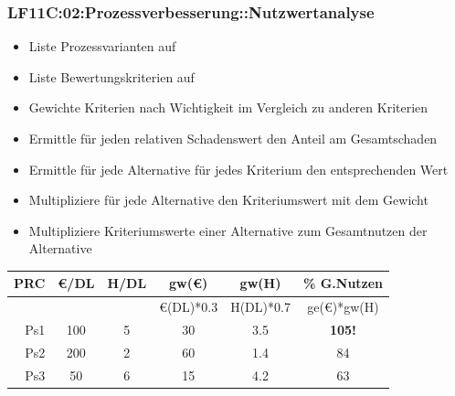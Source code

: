 \begin{frame}  
  \frametitle{LF11C:02:Prozessverbesserung::Nutzwertanalyse}

 \begin{tiny}
  \begin{itemize}
    \item Liste Prozessvarianten auf
    \item Liste Bewertungskriterien auf
    \item Gewichte Kriterien nach Wichtigkeit im Vergleich zu anderen Kriterien
    \item Ermittle für jeden relativen Schadenswert den Anteil am Gesamtschaden
    \item Ermittle für jede Alternative für jedes Kriterium den entsprechenden Wert
    \item Multipliziere für jede Alternative den Kriteriumswert mit dem Gewicht
    \item Multipliziere Kriteriumswerte einer Alternative zum Gesamtnutzen der Alternative
  \end{itemize}
  \end{tiny}

  \vspace{0.2cm}
  \begin{footnotesize}
  \begin{center}
   \renewcommand{\arraystretch}{1.5} 
  \begin{tabular}{|r|c|c|c|c|c|}
  \hline
  \textbf{PRC} & \textbf{€/DL} & \textbf{H/DL} & \textbf{gw(€)} & \textbf{gw(H)} & \textbf{\% G.Nutzen}\\ \hline
   &  &  & €(DL)*0.3 & H(DL)*0.7 & ge(€)*gw(H) \\ \hline
  Ps1 & 100 & 5 & 30 & 3.5 & \textbf{105!} \\ \hline
  Ps2 & 200 & 2 & 60 & 1.4 &  84 \\ \hline
  Ps3 &  50 & 6 & 15 & 4.2 &  63 \\ \hline
  \end{tabular}
\end{center}
\end{footnotesize}
\end{frame}

